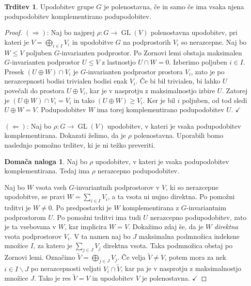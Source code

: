 \documentclass[11pt]{book}
\DeclareMathOperator\GL{GL}
\def\kljuka{$\checkmark$}
\theoremstyle{definition}
\theoremstyle{zgled}
\theoremstyle{odprtproblem}
\theoremstyle{domacanaloga}
\newtheorem*{domacanaloga}{Domača naloga}
\newenvironment{dokaz}
    {\color{siva}\begin{proof}}
    {\end{proof}}
\theoremstyle{izrek}
\newtheorem*{trditev}{Trditev}
\begin{document}
\begin{trditev}
Upodobitev grupe $G$ je polenostavna, če in samo če ima vsaka njena podupodobitev komplementirano podupodobitev.
\end{trditev}
\begin{dokaz}
$(\Rightarrow)$: Naj bo najprej $\rho \colon G \to \GL(V)$ polenostavna upodobitev, pri kateri je $V = \bigoplus_{i \in I} V_i$ in upodobitve $G$ na podprostorih $V_i$ so nerazcepne. Naj bo $W \leq V$ poljuben $G$-invarianten podprostor. Po Zornovi lemi obstaja maksimalen $G$-invarianten podprostor $U \leq V$ z lastnostjo $U \cap W = 0$. Izberimo poljuben $i \in I$. Presek $(U \oplus W) \cap V_i$ je $G$-invarianten podprostor prostora $V_i$, zato je po nerazcepnosti bodisi trivialen bodisi enak $V_i$. Če bi bil trivialen, bi lahko $U$ povečali do prostora $U \oplus V_i$, kar je v nasprotju z maksimalnostjo izbire $U$. Zatorej je $(U \oplus W) \cap V_i = V_i$ in tako $(U \oplus W) \geq V_i$. Ker je bil $i$ poljuben, od tod sledi $U \oplus W = V$. Podupodobitev $W$ ima torej komplementirano podupodobitev $U$. \kljuka

$(\Leftarrow)$: Naj bo $\rho \colon G \to \GL(V)$ upodobitev, v kateri je vsaka podupodobitev komplementirana. Dokazati želimo, da je $\rho$ polenostavna. Uporabili bomo naslednjo pomožno trditev, ki je ni težko preveriti.

\begin{domacanaloga}
Naj bo $\rho$ upodobitev, v kateri je vsaka podupodobitev komplementirana. Tedaj ima $\rho$ nerazcepno podupodobitev.
\end{domacanaloga}

Naj bo $W$ vsota vseh $G$-invariantnih podprostorov v $V$, ki so nerazcepne upodobitve, se pravi $W = \sum_{i \in I} V_i$, a ta vsota ni nujno direktna. Po pomožni trditvi je $W \neq 0$. Po predpostavki je $W$ komplementirana z $G$-invariantnim podprostorom $U$. Po pomožni trditvi ima tudi $U$ nerazcepno podupodobitev, zato je ta vsebovana v $W$, kar implicira $W = V$. Dokažimo zdaj še, da je $W$ \emph{direktna} vsota podprostorov $V_i$. V ta namen naj bo $J$ maksimalna podmnožica indeksne množice $I$, za katero je $\sum_{j \in J} V_j$ direktna vsota. Taka podmnožica obstaj po Zornovi lemi. Označimo $\tilde V = \bigoplus_{j \in J} V_j$. Če velja $\tilde V \neq V$, potem mora za nek $i \in I \backslash J$ po nerazcepnosti veljati $V_i \cap \tilde V$, kar pa je v nasprotju z maksimalnostjo množice $J$. Tako je res $\tilde V = V$ in upodobitev $V$ je polenostavna. \kljuka
\end{dokaz}
\end{document}
